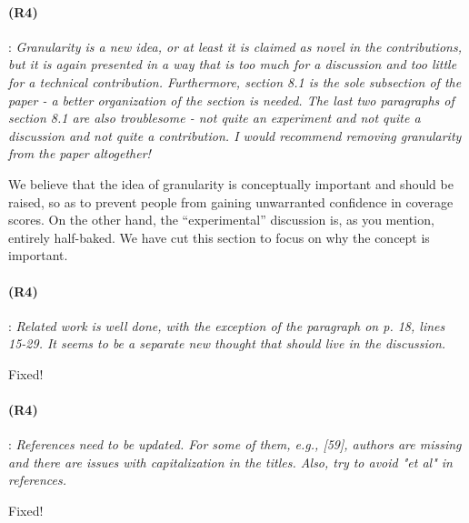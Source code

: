 \documentclass{article}
\begin{document}
\paragraph{(R4)}: \textit{Granularity is a new idea, or at least it is claimed as novel in the contributions, but it is again presented in a way that is too much for a discussion and too little for a technical contribution. Furthermore, section 8.1 is the sole subsection of the paper - a better organization of the section is needed.  The last two paragraphs of section 8.1 are also troublesome - not quite an experiment and not quite a discussion and not quite a contribution.  I would recommend removing granularity from the paper altogether!}
\vspace{0.05in}

We believe that the idea of granularity is conceptually important and should be raised, so as to prevent people from gaining unwarranted confidence in coverage scores.  On the other hand, the ``experimental'' discussion is, as you mention, entirely half-baked.  We have cut this section to focus on why the concept is important.


\paragraph{(R4)}: \textit{Related work is well done, with the exception of the paragraph on p. 18, lines 15-29. It seems to be a separate new thought that should live in the discussion.}
\vspace{0.05in}

Fixed!

\paragraph{(R4)}: \textit{References need to be updated. For some of them, e.g., [59], authors are missing and there are issues with capitalization in the titles. Also, try to avoid "et al" in references.}
\vspace{0.05in}

Fixed!
\end{document}
